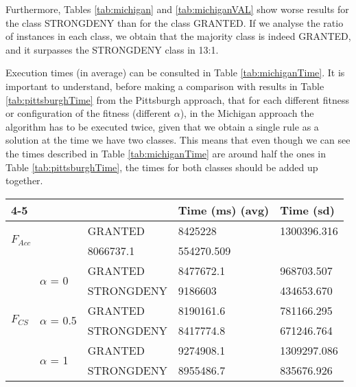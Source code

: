 \documentclass[a4paper,10pt,twocolumn,preprint,3p]{elsarticle}
\begin{document}
Furthermore, Tables \ref{tab:michigan} and \ref{tab:michiganVAL} show worse results for the class STRONGDENY than for the class GRANTED. If we analyse the ratio of instances in each class, we obtain that the majority class is indeed GRANTED, and it surpasses the STRONGDENY class in 13:1.

Execution times (in average) can be consulted in Table \ref{tab:michiganTime}. It is important to understand, before making a comparison with results in Table \ref{tab:pittsburghTime} from the Pittsburgh approach, that for each different fitness or configuration of the fitness (different $\alpha$), in the Michigan approach the algorithm has to be executed twice, given that we obtain a single rule as a solution at the time we have two classes. This means that even though we can see the times described in Table \ref{tab:michiganTime} are around half the ones in Table \ref{tab:pittsburghTime}, the times for both classes should be added up together.

\begin{table*}
\begin{center}
\begin{tabular}{lll|l|l|}
\cline{4-5}
                                                &                                                      &            & Time (ms) (avg) & Time (sd)   \\ \hline
\multicolumn{2}{|l|}{\multirow{2}{*}{$F_{Acc}$}}                                                       & GRANTED    & 8425228         & 1300396.316 \\ \cline{3-5} 
\multicolumn{2}{|l|}{}                                                                                 & STRONGDENY & 8066737.1       & 554270.509  \\ \hline
\multicolumn{1}{|l|}{\multirow{6}{*}{$F_{CS}$}} & \multicolumn{1}{l|}{\multirow{2}{*}{$\alpha$ = 0}}   & GRANTED    & 8477672.1       & 968703.507  \\ \cline{3-5} 
\multicolumn{1}{|l|}{}                          & \multicolumn{1}{l|}{}                                & STRONGDENY & 9186603         & 434653.670  \\ \cline{2-5} 
\multicolumn{1}{|l|}{}                          & \multicolumn{1}{l|}{\multirow{2}{*}{$\alpha$ = 0.5}} & GRANTED    & 8190161.6       & 781166.295  \\ \cline{3-5} 
\multicolumn{1}{|l|}{}                          & \multicolumn{1}{l|}{}                                & STRONGDENY & 8417774.8       & 671246.764  \\ \cline{2-5} 
\multicolumn{1}{|l|}{}                          & \multicolumn{1}{l|}{\multirow{2}{*}{$\alpha$ = 1}}   & GRANTED    & 9274908.1       & 1309297.086 \\ \cline{3-5} 
\multicolumn{1}{|l|}{}                          & \multicolumn{1}{l|}{}                                & STRONGDENY & 8955486.7       & 835676.926  \\ \hline
\end{tabular}
\caption{Average execution time for each used fitness for the Pittsburgh approach.}
\label{tab:michiganTime}
\end{center}
\end{table*}
\end{document}
